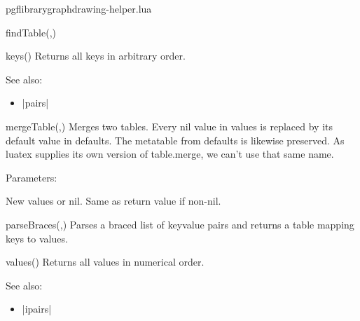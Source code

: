\begin{filedescription}{pgflibrarygraphdrawing-helper.lua}
\begin{luacommand}{{findTable}(,)}
\end{luacommand}
\begin{luacommand}{{keys}()}
Returns all keys in arbitrary order.



See also:
\begin{itemize}
	\item[] |pairs|
\end{itemize}

\end{luacommand}
\begin{luacommand}{{mergeTable}(,)}
Merges two tables. Every nil value in values is replaced by its default value in defaults.  The metatable from defaults is likewise preserved. As luatex supplies its own version of table.merge, we can't use that same name.

Parameters:
\begin{parameterdescription}
	\item[\meta{values}] New values or nil. Same as return value if non-nil.
\end{parameterdescription}



\end{luacommand}
\begin{luacommand}{{parseBraces}(,)}
Parses a braced list of {key}{value} pairs and returns a table mapping keys to values.



\end{luacommand}
\begin{luacommand}{{values}()}
Returns all values in numerical order.



See also:
\begin{itemize}
	\item[] |ipairs|
\end{itemize}

\end{luacommand}

\end{filedescription}